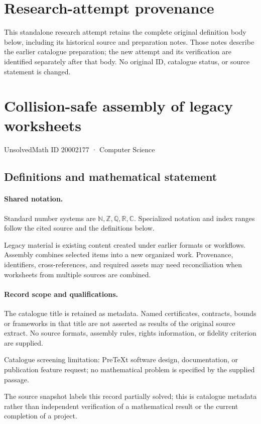 \documentclass[11pt]{article}
\begin{document}
\section*{Research-attempt provenance}
This standalone research attempt retains the complete original definition body below,
including its historical source and preparation notes. Those notes describe the
earlier catalogue preparation; the new attempt and its verification are identified
separately after that body. No original ID, catalogue status, or source statement is changed.

\section{Collision-safe assembly of legacy worksheets}\label{20002177}
{\small UnsolvedMath ID 20002177 · Computer Science}
\subsection{Definitions and mathematical statement}

\paragraph{Shared notation.}Standard number systems are $\mathbb N,\mathbb Z,\mathbb Q,\mathbb R,\mathbb C$. Specialized notation and index ranges follow the cited source and the definitions below.


Legacy material is existing content created under earlier formats or workflows. Assembly combines selected items into a new organized work. Provenance, identifiers, cross-references, and required assets may need reconciliation when worksheets from multiple sources are combined.
\paragraph{Record scope and qualifications.}
The catalogue title is retained as metadata. Named certificates, contracts, bounds or frameworks in that title are not asserted as results of the original source extract.
No source formats, assembly rules, rights information, or fidelity criterion are supplied.

Catalogue screening limitation: PreTeXt software design, documentation, or publication feature request; no mathematical problem is specified by the supplied passage.

The source snapshot labels this record partially solved; this is catalogue metadata rather than independent verification of a mathematical result or the current completion of a project.
\end{document}
